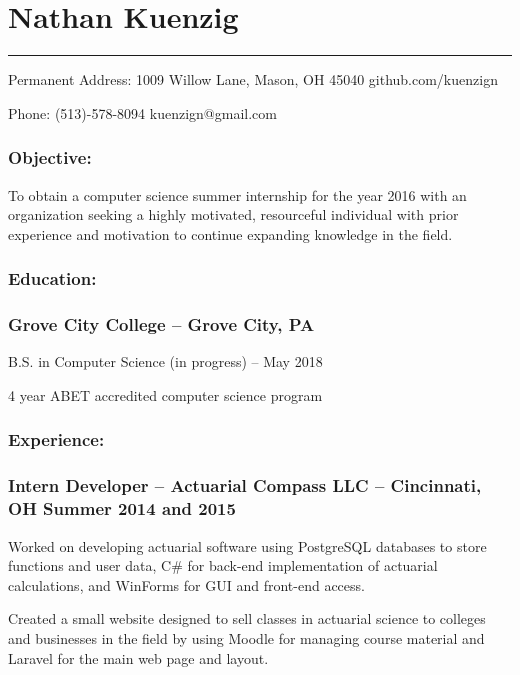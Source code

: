 \documentclass[12pt]{article}
\begin{document}
{
	\centering\section*{\color{head}Nathan Kuenzig}
	\vspace{-7mm}
	\noindent\color{head2}\rule{\textwidth}{1pt}
	
	{\footnotesize {\color{accent}Permanent Address:} 1009 Willow Lane, Mason, OH 45040  github.com/kuenzign
		
	{\color{accent}Phone:} (513)-578-8094  kuenzign@gmail.com}

}

\subsubsection*{\color{head}Objective:}
\small To obtain a computer science summer internship for the year 2016 with an organization seeking a highly motivated, resourceful individual with prior experience and motivation to continue expanding knowledge in the field.

\subsubsection*{\color{head}Education:}
\subsubsection*{\textnormal{{\color{accent} Grove City College }\color{head} -- Grove City, PA}}

\noindent\hspace{2.25pc} B.S. in Computer Science (in progress) -- May 2018

\noindent\hspace{2.25pc} 4 year ABET accredited computer science program

\subsubsection*{\color{head}Experience:}
\subsubsection*{\textnormal{{\color{accent} Intern Developer }\color{head} -- Actuarial Compass LLC -- Cincinnati, OH	\hfill Summer 2014 and 2015}}
\begin{compactitem}
	\item Worked on developing actuarial software using PostgreSQL databases to store functions and user data, C\# for back-end implementation of actuarial calculations, and WinForms for GUI and front-end access.
	\item Created a small website designed to sell classes in actuarial science to colleges and businesses in the field by using Moodle for managing course material and Laravel for the main web page and layout.
\end{compactitem}
\end{document}
